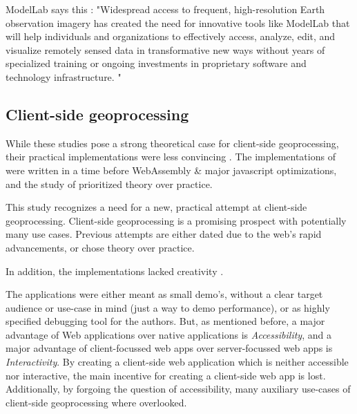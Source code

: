 ModelLab says this : "Widespread access to frequent, high-resolution Earth observation imagery has created the need for innovative tools like ModelLab that will help individuals and organizations to effectively access, analyze, edit, and visualize remotely sensed data in transformative new ways without years of specialized training or ongoing investments in proprietary software and technology infrastructure. "


\subsection{Client-side geoprocessing}


While these studies pose a strong theoretical case for client-side geoprocessing, their practical implementations were less convincing . 
The implementations of \cite{panidi_hybrid_2015, hamilton_client-side_2014} were written in a time before WebAssembly \& major javascript optimizations, and the study of \cite{kulawiak_analysis_2019} prioritized theory over practice. 


This study recognizes a need for a new, practical attempt at client-side geoprocessing. 
Client-side geoprocessing is a promising prospect with potentially many use cases.
Previous attempts are either dated due to the web's rapid advancements, or chose theory over practice.

In addition, the implementations lacked creativity . 

The applications were either meant as small demo's, without a clear target audience or use-case in mind (just a way to demo performance), or as highly specified debugging tool for the authors.   
But, as mentioned before, a major advantage of Web applications over native applications is \emph{Accessibility}, and a major advantage of client-focussed web apps over server-focussed web apps is \emph{Interactivity}. 
By creating a client-side web application which is neither accessible nor interactive, the main incentive for creating a client-side web app is lost.
Additionally, by forgoing the question of accessibility, many auxiliary use-cases of client-side geoprocessing where overlooked.

